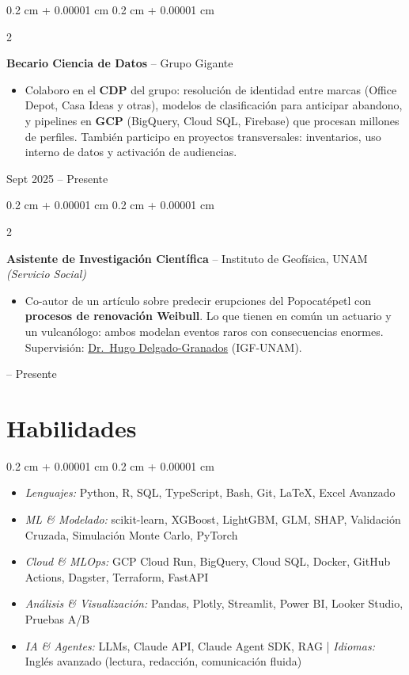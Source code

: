 \documentclass[10pt, letterpaper]{article}
\newenvironment{highlights}{
    \begin{itemize}[
        topsep=0.05 cm,
        parsep=0.05 cm,
        partopsep=0pt,
        itemsep=0pt,
        leftmargin=0.4 cm + 10pt
    ]
}{
    \end{itemize}
}
\newenvironment{highlightsforbulletentries}{
    \begin{itemize}[
        topsep=0.05 cm,
        parsep=0.05 cm,
        partopsep=0pt,
        itemsep=0pt,
        leftmargin=10pt
    ]
}{
    \end{itemize}
}
\newenvironment{onecolentry}{
    \begin{adjustwidth}{
        0.2 cm + 0.00001 cm
    }{
        0.2 cm + 0.00001 cm
    }
}{
    \end{adjustwidth}
}
\newenvironment{twocolentry}[2][]{
    \onecolentry
    \def\secondColumn{#2}
    \setcolumnwidth{\fill, 4.5 cm}
    \begin{paracol}{2}
}{
    \switchcolumn \raggedleft \secondColumn
    \end{paracol}
    \endonecolentry
}
\let\hrefWithoutArrow\href
\renewcommand{\href}[2]{\hrefWithoutArrow{#1}{\ifthenelse{\equal{#2}{}}{ }{#2 }\raisebox{.15ex}{\footnotesize \faExternalLink*}}}
\begin{document}
        \begin{twocolentry}{
            Sept 2025 -- Presente
        }
            \textbf{Becario Ciencia de Datos} -- Grupo Gigante
            \begin{highlights}
                \item Colaboro en el \textbf{CDP} del grupo: resolución de identidad entre marcas (Office Depot, Casa Ideas y otras), modelos de clasificación para anticipar abandono, y pipelines en \textbf{GCP} (BigQuery, Cloud SQL, Firebase) que procesan millones de perfiles. También participo en proyectos transversales: inventarios, uso interno de datos y activación de audiencias.
            \end{highlights}
        \end{twocolentry}

        \vspace{0.10 cm}

        \begin{twocolentry}{
            2025 -- Presente
        }
            \textbf{Asistente de Investigación Científica} -- Instituto de Geofísica, UNAM \textit{(Servicio Social)}
            \begin{highlights}
                \item Co-autor de un artículo sobre predecir erupciones del Popocatépetl con \textbf{procesos de renovación Weibull}. Lo que tienen en común un actuario y un vulcanólogo: ambos modelan eventos raros con consecuencias enormes. Supervisión: \hrefWithoutArrow{https://scholar.google.com/citations?user=lDD0DZQAAAAJ}{Dr.\ Hugo Delgado-Granados} (IGF-UNAM).
            \end{highlights}
        \end{twocolentry}


    \section{Habilidades}

\begin{onecolentry}
    \begin{highlightsforbulletentries}
        \item \textit{Lenguajes:} Python, R, SQL, TypeScript, Bash, Git, \LaTeX, Excel Avanzado
        \item \textit{ML \& Modelado:} scikit-learn, XGBoost, LightGBM, GLM, SHAP, Validación Cruzada, Simulación Monte Carlo, PyTorch
        \item \textit{Cloud \& MLOps:} GCP Cloud Run, BigQuery, Cloud SQL, Docker, GitHub Actions, Dagster, Terraform, FastAPI
        \item \textit{Análisis \& Visualización:} Pandas, Plotly, Streamlit, Power BI, Looker Studio, Pruebas A/B
        \item \textit{IA \& Agentes:} LLMs, Claude API, Claude Agent SDK, RAG | \textit{Idiomas:} Inglés avanzado (lectura, redacción, comunicación fluida)
    \end{highlightsforbulletentries}
\end{onecolentry}
\end{document}
